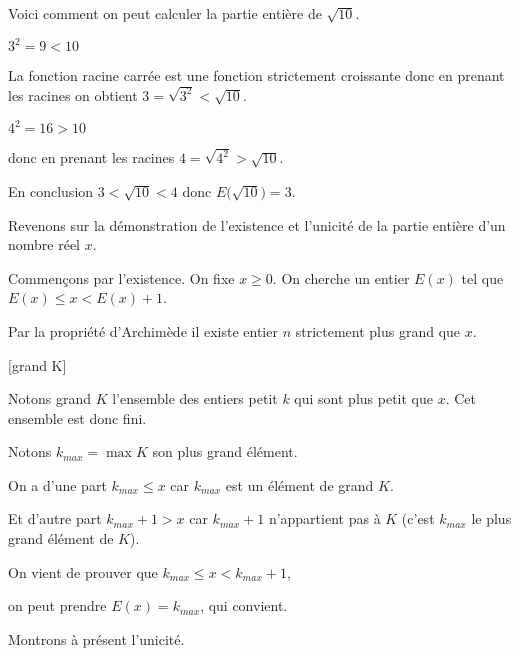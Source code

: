 
\diapo

Voici comment on peut calculer la partie entière de $\sqrt{10}$.

\change

$3^2 = 9 < 10$  

\change

La fonction racine carrée est une fonction strictement croissante
donc en prenant les racines on obtient $3=\sqrt{3^2} < \sqrt{10}$.


\change

$4^2=16 > 10$ 

\change

donc en prenant les racines $4=\sqrt{4^2} > \sqrt{10}$.

\change

En conclusion $3 < \sqrt{10} < 4$ donc $E\big(\sqrt{10}\big)=3$.

\change

Revenons sur la démonstration de l'existence et l'unicité de la 
partie entière d'un nombre réel $x$.

Commençons par l'existence. On fixe $x\geq 0$.
On cherche un entier $E(x)$  tel que $E(x)\leq x <E(x)+1$.

\change 

Par la propriété d'Archimède il existe entier $n$ strictement plus grand que $x$.

\change 

[grand K]

Notons  grand $K$ l'ensemble des entiers petit $k$ qui sont plus petit que $x$.
Cet ensemble est donc fini. 

\change

Notons $k_{max}=\max K$ son plus grand élément.

\change 

On a d'une part $k_{max}\leq x$ car $k_{max}$ est un élément de grand $K$. 

\change

Et d'autre part $k_{max}+1 > x$ car $k_{max}+1$ n'appartient pas à $K$
(c'est $k_{max}$ le plus grand élément de $K$). 

\change 

On vient de prouver que $k_{max}\leq x< k_{max}+1$, 

on peut prendre $E(x)=k_{max}$, qui convient.

\change 

Montrons à présent l'unicité.


